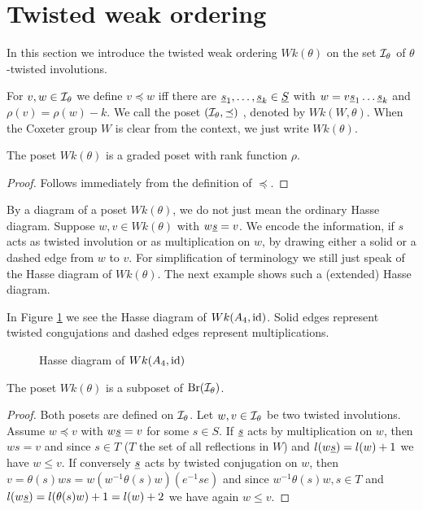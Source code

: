 \section{Twisted weak ordering}
\label{sec:twisted-involutions-twisted-weak-ordering}

In this section we introduce the twisted weak ordering $Wk(\theta)$ on the set $\mathcal{I}_{\theta}$ of $\theta$-twisted involutions.

\begin{defi}
	For $v,w \in \mathcal{I}_{\theta}$ we define $v \preceq w$ iff there are $\underline{s}_1, \ldots, \underline{s}_k \in \underline{S}$ with $w = v \underline{s}_1 \ldots \underline{s}_k$ and $\rho(v) = \rho(w) - k$. We call the poset $(\mathcal{I}_{\theta},\preceq)$ , denoted by $Wk(W, \theta)$. When the Coxeter group $W$ is clear from the context, we just write $Wk(\theta)$.
\end{defi}

\begin{lemm}
	The poset $Wk(\theta)$ is a graded poset with rank function $\rho$.

	\begin{proof}
		Follows immediately from the definition of $\preceq$.
	\end{proof}
\end{lemm}

By a diagram of a poset $Wk(\theta)$, we do not just mean the ordinary Hasse diagram. Suppose $w,v \in Wk(\theta)$ with $w \underline{s} = v$. We encode the information, if $s$ acts as twisted involution or as multiplication on $w$, by drawing either a solid or a dashed edge from $w$ to $v$. For simplification of terminology we still just speak of the Hasse diagram of $Wk(\theta)$. The next example shows such a (extended) Hasse diagram.

\begin{exam}
	In Figure \ref{fig:a4} we see the Hasse diagram of $Wk(A_4, \operatorname{id})$. Solid edges represent twisted congujations and dashed edges represent multiplications.
	\begin{figure}[ht]
		\centering
		
		\caption{Hasse diagram of $Wk(A_4, \operatorname{id})$}
		\label{fig:a4}
	\end{figure}
\end{exam}

\begin{lemm}
	The poset $Wk(\theta)$ is a subposet of $\operatorname{Br}(\mathcal{I}_{\theta})$.

	\begin{proof}
		Both posets are defined on $\mathcal{I}_{\theta}$. Let $w,v \in \mathcal{I}_{\theta}$ be two twisted involutions. Assume $w \preceq v$ with $w \underline{s} = v$ for some $s \in S$. If $\underline{s}$ acts by multiplication on $w$, then $ws = v$ and since $s \in T$ ($T$ the set of all reflections in $W$) and $l(w \underline{s}) = l(w) + 1$ we have $w \leq v$. If conversely $\underline{s}$ acts by twisted conjugation on $w$, then $v = \theta(s)ws = w (w^{-1} \theta(s) w)(e^{-1}se)$ and since $w^{-1} \theta(s) w, s \in T$ and $l(w \underline{s}) = l(\theta(s)w) + 1 = l(w) + 2$ we have again $w \leq v$.
	\end{proof}
\end{lemm}

